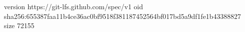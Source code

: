 version https://git-lfs.github.com/spec/v1
oid sha256:655387faa11b4ce36ac0bf9518f381187452564bf017bd5a9df1fe1b43388827
size 72155
